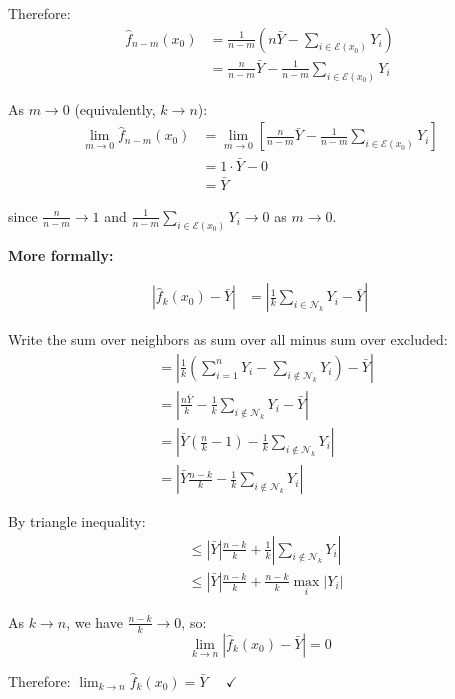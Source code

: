\documentclass[12pt]{article}
\begin{document}
\begin{solution}
Therefore:
\begin{align*}
\hat{f}_{n-m}(x_0) &= \frac{1}{n-m}\left(n\bar{Y} - \sum_{i \in \mathcal{E}(x_0)} Y_i\right) \\
&= \frac{n}{n-m}\bar{Y} - \frac{1}{n-m}\sum_{i \in \mathcal{E}(x_0)} Y_i
\end{align*}

As \(m \to 0\) (equivalently, \(k \to n\)):
\begin{align*}
\lim_{m \to 0} \hat{f}_{n-m}(x_0) &= \lim_{m \to 0} \left[\frac{n}{n-m}\bar{Y} - \frac{1}{n-m}\sum_{i \in \mathcal{E}(x_0)} Y_i\right] \\
&= 1 \cdot \bar{Y} - 0 \\
&= \bar{Y}
\end{align*}

since \(\frac{n}{n-m} \to 1\) and \(\frac{1}{n-m}\sum_{i \in \mathcal{E}(x_0)} Y_i \to 0\) as \(m \to 0\).

\textbf{More formally:}

\begin{align*}
\left|\hat{f}_k(x_0) - \bar{Y}\right| &= \left|\frac{1}{k}\sum_{i \in \mathcal{N}_k} Y_i - \bar{Y}\right|
\end{align*}

Write the sum over neighbors as sum over all minus sum over excluded:
\begin{align*}
&= \left|\frac{1}{k}\left(\sum_{i=1}^n Y_i - \sum_{i \notin \mathcal{N}_k} Y_i\right) - \bar{Y}\right| \\
&= \left|\frac{n\bar{Y}}{k} - \frac{1}{k}\sum_{i \notin \mathcal{N}_k} Y_i - \bar{Y}\right| \\
&= \left|\bar{Y}\left(\frac{n}{k} - 1\right) - \frac{1}{k}\sum_{i \notin \mathcal{N}_k} Y_i\right| \\
&= \left|\bar{Y}\frac{n-k}{k} - \frac{1}{k}\sum_{i \notin \mathcal{N}_k} Y_i\right|
\end{align*}

By triangle inequality:
\begin{align*}
&\leq \left|\bar{Y}\right|\frac{n-k}{k} + \frac{1}{k}\left|\sum_{i \notin \mathcal{N}_k} Y_i\right| \\
&\leq \left|\bar{Y}\right|\frac{n-k}{k} + \frac{n-k}{k}\max_i |Y_i|
\end{align*}

As \(k \to n\), we have \(\frac{n-k}{k} \to 0\), so:
\[
\lim_{k \to n} \left|\hat{f}_k(x_0) - \bar{Y}\right| = 0
\]

Therefore: \(\boxed{\lim_{k \to n} \hat{f}_k(x_0) = \bar{Y}}\) \(\quad \checkmark\)


\end{solution}
\end{document}
